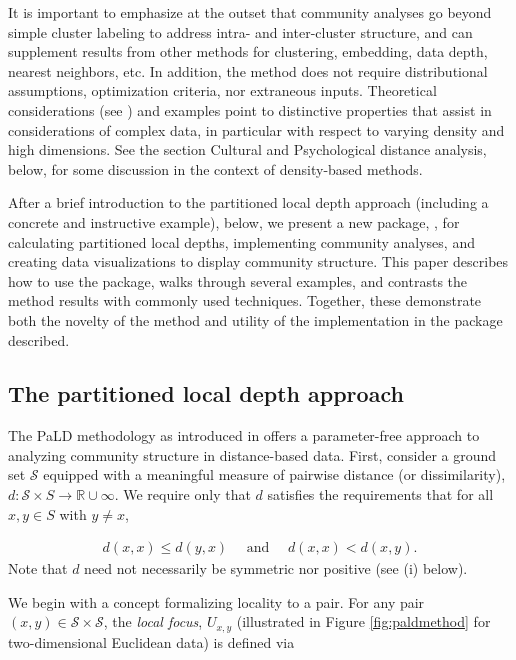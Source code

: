 It is important to emphasize at the outset that community analyses go beyond simple cluster labeling to address intra- and inter-cluster structure, and can supplement results from other methods for clustering, embedding, data depth, nearest neighbors, etc. In addition, the method does not require distributional assumptions, optimization criteria, nor extraneous inputs. Theoretical considerations (see \citet{berenhaut2022social}) and examples point to distinctive properties that assist in considerations of complex data, in particular with respect to varying density and high dimensions. See the section Cultural and Psychological distance analysis, below, for some discussion in the context of density-based methods.

After a brief introduction to the partitioned
local depth approach (including a concrete and instructive example), below, we present a new package, , for calculating partitioned local depths, implementing community analyses, and
creating data visualizations to display community structure. This paper describes how to use the package, walks through several examples, and contrasts the method results with commonly used techniques. Together, these
demonstrate both the novelty of the method and utility of the
implementation in the package described.

\hypertarget{the-partitioned-local-depth-approach}{%
\subsection{The partitioned local depth approach}\label{the-partitioned-local-depth-approach}}

The PaLD methodology as introduced in \citet{berenhaut2022social} offers a parameter-free approach to analyzing community structure in distance-based data. First, consider a ground set \(\mathcal{S}\) equipped with a meaningful measure of pairwise distance (or dissimilarity), \(d:\mathcal{S}\times S\rightarrow \mathbb{R}\cup \infty\). We require only that \(d\) satisfies the requirements that for all \(x,y\in S\) with \(y\neq x\),

\begin{eqnarray}
d(x,x) \leq d(y,x) \mbox{~~~~and~~~~} d(x,x)< d(x,y).
\label{theonereq}
\end{eqnarray}
\noindent Note that \(d\) need not necessarily be symmetric nor positive (see (i) below).

We begin with a concept formalizing locality to a pair. For any pair \((x, y)\in \mathcal{S}\times \mathcal{S}\), the \emph{local focus}, \(U_{x,y}\) (illustrated in Figure \ref{fig:paldmethod} for two-dimensional Euclidean data) is defined via

